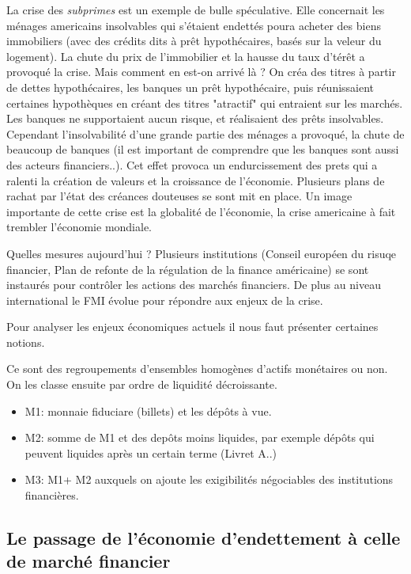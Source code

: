 La crise des \emph{subprimes} est un exemple de bulle spéculative. Elle concernait les ménages americains insolvables qui s'étaient endettés poura acheter des
biens immobiliers (avec des crédits dits à prêt hypothécaires, basés sur la veleur du logement). La chute du prix de l'immobilier et la hausse du taux d'térêt a 
provoqué la crise. Mais comment en est-on arrivé là ? On créa des titres à partir de dettes hypothécaires, les banques un prêt hypothécaire, puis réunissaient 
certaines hypothèques en créant des titres "atractif" qui entraient sur les marchés. Les banques ne supportaient aucun risque, et réalisaient des prêts 
insolvables. Cependant l'insolvabilité d'une grande partie des ménages a provoqué, la chute de beaucoup de banques (il est important de comprendre que les 
banques sont aussi des acteurs financiers..). Cet effet provoca un endurcissement des prets qui a ralenti la création de valeurs et la croissance de 
l'économie. Plusieurs plans de rachat par l'état des créances douteuses se sont mit en place. Un image importante de cette crise est la globalité de 
l'économie, la crise americaine à fait trembler l'économie mondiale. 

Quelles mesures aujourd'hui ? Plusieurs institutions (Conseil européen du risuqe financier, Plan de refonte de la régulation de la finance américaine) se sont
 instaurés pour contrôler les actions des marchés financiers. De plus au niveau international le FMI évolue pour répondre aux enjeux de la crise. 
 
Pour analyser les enjeux économiques actuels il nous faut présenter certaines notions.

\begin{tcolorbox}[title=Les agrégats monétaires]
	Ce sont des regroupements d'ensembles homogènes d'actifs monétaires ou non. On les classe ensuite par ordre de liquidité décroissante. 
	\begin{itemize}[label=]
		\item M1: monnaie fiduciare (billets) et les dépôts à vue.
		\item M2: somme de M1 et des depôts moins liquides, par exemple dépôts qui peuvent liquides après un certain terme (Livret A..)
		\item M3: M1+ M2 auxquels on ajoute les exigibilités négociables des institutions financières.
	\end{itemize}
	
\end{tcolorbox}

\subsection{Le passage de l'économie d'endettement à celle de marché financier} %
\label{sec:le_passage_de_l_economie_d_endettement_a_celle_de_marche_financier}

